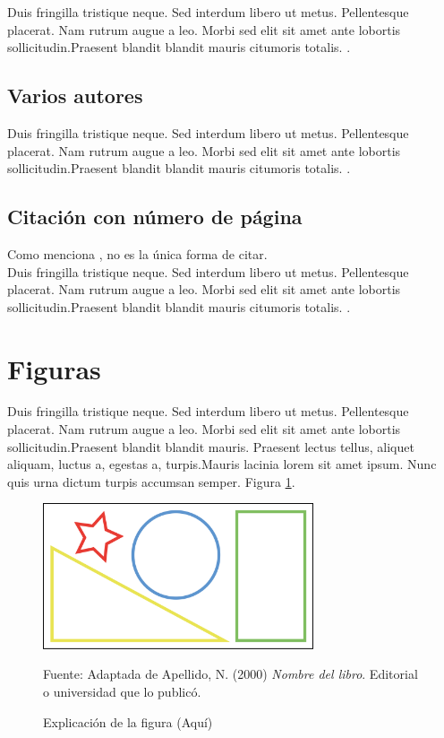 Duis fringilla tristique neque. Sed interdum libero ut metus.
Pellentesque placerat. Nam rutrum augue a leo. Morbi sed 
elit sit amet ante lobortis sollicitudin.Praesent blandit 
blandit mauris citumoris totalis. \cite{libro:ejemplo}.

\subsection*{Varios autores}

Duis fringilla tristique neque. Sed interdum libero ut metus.
Pellentesque placerat. Nam rutrum augue a leo. Morbi sed 
elit sit amet ante lobortis sollicitudin.Praesent blandit 
blandit mauris citumoris totalis. \cite{libro:ejemplo_varios_autores}.

\subsection{Citación con número de página}

Como menciona , no es la única
forma de citar.\\

Duis fringilla tristique neque. Sed interdum libero ut metus.
Pellentesque placerat. Nam rutrum augue a leo. Morbi sed 
elit sit amet ante lobortis sollicitudin.Praesent blandit 
blandit mauris citumoris totalis. \cite[p.~7-12]{libro:ejemplo_varios_autores}.

\section{Figuras}
Duis fringilla tristique neque. Sed interdum libero ut metus.
Pellentesque placerat. Nam rutrum augue a leo. Morbi sed 
elit sit amet ante lobortis sollicitudin.Praesent blandit 
blandit mauris. Praesent lectus tellus, aliquet aliquam,
luctus a, egestas a, turpis.Mauris lacinia lorem sit amet
ipsum. Nunc quis urna dictum turpis accumsan semper. Figura
\ref{fig:ejemplo}.\\

\begin{figure}[H]
    \begin{center}
        \includegraphics[width=8cm]{img/figura_ejemplo.png}
    \end{center}
    \caption{Explicación de la figura (Aquí)}
    Fuente: Adaptada de Apellido, N. (2000) \textit{Nombre del libro}.
    Editorial o universidad que lo publicó.
    \label{fig:ejemplo}
\end{figure}

